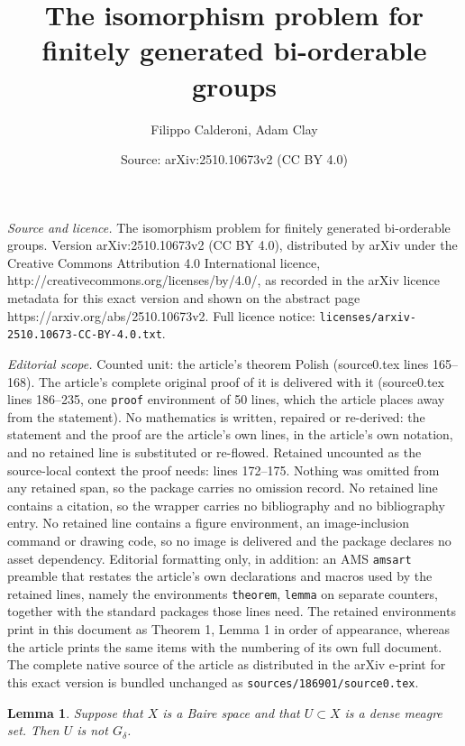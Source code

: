 \documentclass[10pt,a4paper]{amsart}
\title{The isomorphism problem for finitely generated bi-orderable groups}
\author{Filippo Calderoni, Adam Clay}
\date{Source: arXiv:2510.10673v2 (CC BY 4.0)}
\newtheorem{lemma}{Lemma}
\begin{document}
\maketitle

\noindent\emph{Source and licence.} The isomorphism problem for finitely generated bi-orderable groups. Version arXiv:2510.10673v2 (CC BY 4.0), distributed by arXiv under the Creative Commons Attribution 4.0 International licence, http://creativecommons.org/licenses/by/4.0/, as recorded in the arXiv licence metadata for this exact version and shown on the abstract page https://arxiv.org/abs/2510.10673v2. Full licence notice: \texttt{licenses/arxiv-2510.10673-CC-BY-4.0.txt}.\par\smallskip

\noindent\textit{Editorial scope.} Counted unit: the article's theorem Polish (source0.tex lines 165--168). The article's complete original proof of it is delivered with it (source0.tex lines 186--235, one \texttt{proof} environment of 50 lines, which the article places away from the statement). No mathematics is written, repaired or re-derived: the statement and the proof are the article's own lines, in the article's own notation, and no retained line is substituted or re-flowed.  Retained uncounted as the source-local context the proof needs: lines 172--175.  Nothing was omitted from any retained span, so the package carries no omission record.  No retained line contains a citation, so the wrapper carries no bibliography and no bibliography entry.  No retained line contains a figure environment, an image-inclusion command or drawing code, so no image is delivered and the package declares no asset dependency.  Editorial formatting only, in addition: an AMS \texttt{amsart} preamble that restates the article's own declarations and macros used by the retained lines, namely the environments \texttt{theorem}, \texttt{lemma} on separate counters, together with the standard packages those lines need.  The retained environments print in this document as Theorem 1, Lemma 1 in order of appearance, whereas the article prints the same items with the numbering of its own full document.  The complete native source of the article as distributed in the arXiv e-print for this exact version is bundled unchanged as \texttt{sources/186901/source0.tex}.
\begin{lemma}
\label{lem:not_g_delta}
    Suppose that $X$ is a Baire space and that $U \subset X$ is a dense meagre set.  Then $U$ is not $G_{\delta}$.
\end{lemma}
\end{document}
